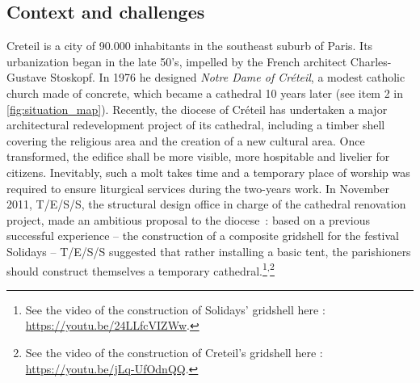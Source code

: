 \subsection{Context and challenges}
Creteil is a city of 90.000 inhabitants in the southeast suburb of Paris. Its urbanization began in the late 50’s, impelled by the French architect Charles-Gustave Stoskopf. In 1976 he designed \emph{Notre Dame of Créteil}, a modest catholic church made of concrete, which became a cathedral 10 years later (see item 2 in \cref{fig:situation_map}). Recently, the diocese of Créteil has undertaken a major architectural redevelopment project of its cathedral, including a timber shell covering the religious area and the creation of a new cultural area. Once transformed, the edifice shall be more visible, more hospitable and livelier for citizens. Inevitably, such a molt takes time and a temporary place of worship was required to ensure liturgical services during the two-years work. In November 2011, T/E/S/S, the structural design office in charge of the cathedral renovation project, made an ambitious proposal to the diocese~: based on a previous successful experience – the construction of a composite gridshell for the festival Solidays \cite{Baverel2012} – T/E/S/S suggested that rather installing a basic tent, the parishioners should construct themselves a temporary cathedral.\footnote{See the video of the construction of Solidays' gridshell here : \url{https://youtu.be/24LLfcVIZWw}.}\textsuperscript{,}\footnote{See the video of the construction of Creteil's gridshell here : \url{https://youtu.be/jLq-UfOdnQQ}.}



